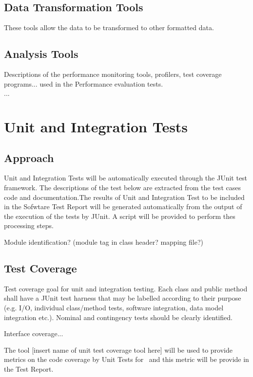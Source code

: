 \subsection{Data Transformation Tools}
These tools allow the data to be transformed to other formatted data.

\subsection{Analysis Tools}
Descriptions of the performance monitoring tools, profilers, test coverage programs... used in the Performance evaluation tests.\\
...

\section{Unit and Integration Tests}

\subsection{Approach}

Unit and Integration Tests will be automatically executed through the JUnit test framework. The descriptions of the test below are extracted from the test cases code and documentation.The results of Unit and Integration Test to be included in the Sofwtare Test Report will be generated automatically from the output of the execution of the tests by JUnit. A script will be provided to perform thes processing steps.

Module identification? (module tag in class header? mapping file?)

\subsection{Test Coverage}

Test coverage goal for unit and integration testing. Each class and public method shall have a JUnit test harness that may be labelled according to their purpose (e.g. I/O, individual class/method tests, software integration, data model integration etc.). Nominal and contingency
tests should be clearly identified.

Interface coverage...

The tool [insert name of unit test coverage tool here] will be used to provide metrics on the code coverage by Unit Tests for \product \ and this metric will be provide in the Test Report.

